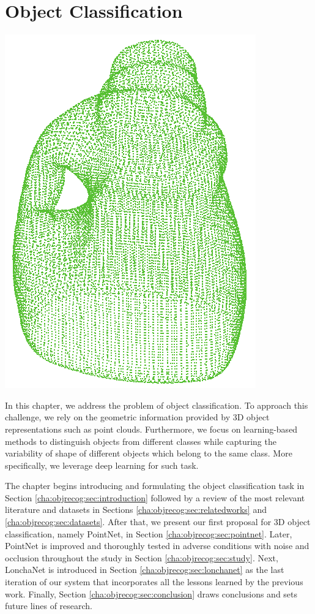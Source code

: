\chapter{Object Classification}
\label{cha:objrecog}

\begin{center}
    \includegraphics[width=0.49\linewidth]{Figures/ObjRecog/cloud}
\end{center}

\begin{chapterabstract}
In this chapter, we address the problem of object classification. To approach this challenge, we rely on the geometric information provided by 3D object representations such as point clouds. Furthermore, we focus on learning-based methods to distinguish objects from different classes while capturing the variability of shape of different objects which belong to the same class. More specifically, we leverage deep learning for such task.

The chapter begins introducing and formulating the object classification task in Section \ref{cha:objrecog:sec:introduction} followed by a review of the most relevant literature and datasets in Sections \ref{cha:objrecog:sec:relatedworks} and \ref{cha:objrecog:sec:datasets}. After that, we present our first proposal for 3D object classification, namely PointNet, in Section \ref{cha:objrecog:sec:pointnet}. Later, PointNet is improved and thoroughly tested in adverse conditions with noise and occlusion throughout the study in Section \ref{cha:objrecog:sec:study}. Next, LonchaNet is introduced in Section \ref{cha:objrecog:sec:lonchanet} as the last iteration of our system that incorporates all the lessons learned by the previous work. Finally, Section \ref{cha:objrecog:sec:conclusion} draws conclusions and sets future lines of research.
\end{chapterabstract}

